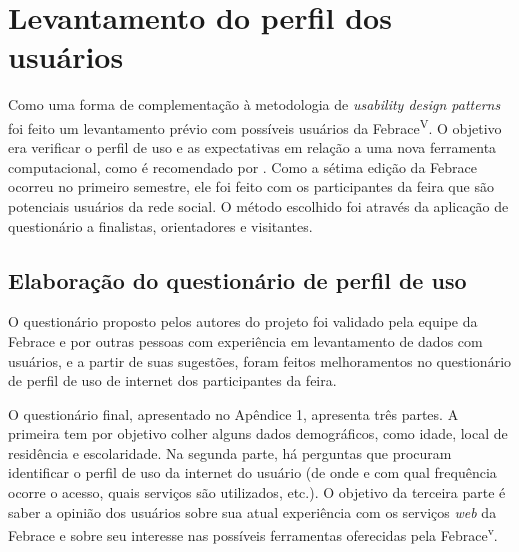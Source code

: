 \section{Levantamento do perfil dos usuários}

Como uma forma de complementação à metodologia de \textit{usability design patterns} foi feito um levantamento prévio com possíveis usuários da Febrace\textsuperscript{V}. O objetivo era verificar o perfil de uso e as expectativas em relação a uma nova ferramenta computacional, como é recomendado por . Como a sétima edição da Febrace ocorreu no primeiro semestre, ele foi feito com os participantes da feira que são potenciais usuários da rede social. O método escolhido foi através da aplicação de questionário a finalistas, orientadores e visitantes.

  \subsection{Elaboração do questionário de perfil de uso}

    O questionário proposto pelos autores do projeto foi validado pela equipe da Febrace e por outras pessoas com experiência em levantamento de dados com usuários, e a partir de suas sugestões, foram feitos melhoramentos no questionário de perfil de uso de internet dos participantes da feira.

    O questionário final, apresentado no Apêndice 1, apresenta três partes. A primeira tem por objetivo colher alguns dados demográficos, como idade, local de residência e escolaridade. Na segunda parte, há perguntas que procuram identificar o perfil de uso da internet do usuário (de onde e com qual frequência ocorre o acesso, quais serviços são utilizados, etc.). O objetivo da terceira parte é saber a opinião dos usuários sobre sua atual experiência com os serviços \textit{web} da Febrace e sobre seu interesse nas possíveis ferramentas oferecidas pela Febrace\textsuperscript{v}.
